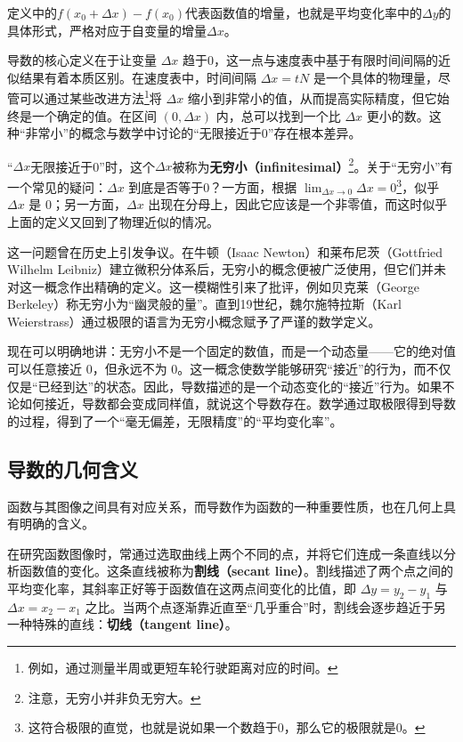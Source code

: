 定义中的$f(x_0+\Delta x)-f(x_0)$代表函数值的增量，也就是平均变化率中的$\Delta y$的具体形式，严格对应于自变量的增量$\Delta x$。

导数的核心定义在于让变量 $\Delta x$ 趋于0，这一点与速度表中基于有限时间间隔的近似结果有着本质区别。在速度表中，时间间隔 $\Delta x = tN$ 是一个具体的物理量，尽管可以通过某些改进方法\footnote{例如，通过测量半周或更短车轮行驶距离对应的时间。}将 $\Delta x$ 缩小到非常小的值，从而提高实际精度，但它始终是一个确定的值。在区间 $(0, \Delta x)$ 内，总可以找到一个比 $\Delta x$ 更小的数。这种“非常小”的概念与数学中讨论的“无限接近于0”存在根本差异。

“$\Delta x$无限接近于0”时，这个$\Delta x$被称为\textbf{无穷小（infinitesimal）}\footnote{注意，无穷小并非负无穷大。}。关于“无穷小”有一个常见的疑问：$\Delta x$ 到底是否等于0？一方面，根据 $\displaystyle\lim_{\Delta x \to 0} \Delta x = 0$\footnote{这符合极限的直觉，也就是说如果一个数趋于0，那么它的极限就是0。}，似乎 $\Delta x$ 是 0；另一方面，$\Delta x$ 出现在分母上，因此它应该是一个非零值，而这时似乎上面的定义又回到了物理近似的情况。

这一问题曾在历史上引发争议。在牛顿（Isaac Newton）和莱布尼茨（Gottfried Wilhelm Leibniz）建立微积分体系后，无穷小的概念便被广泛使用，但它们并未对这一概念作出精确的定义。这一模糊性引来了批评，例如贝克莱（George Berkeley）称无穷小为“幽灵般的量”。直到19世纪，魏尔施特拉斯（Karl Weierstrass）通过极限的语言为无穷小概念赋予了严谨的数学定义。

现在可以明确地讲：无穷小不是一个固定的数值，而是一个动态量——它的绝对值可以任意接近 0，但永远不为 0。这一概念使数学能够研究“接近”的行为，而不仅仅是“已经到达”的状态。因此，导数描述的是一个动态变化的“接近”行为。如果不论如何接近，导数都会变成同样值，就说这个导数存在。数学通过取极限得到导数的过程，得到了一个“毫无偏差，无限精度”的“平均变化率”。

\subsection{导数的几何含义}

函数与其图像之间具有对应关系，而导数作为函数的一种重要性质，也在几何上具有明确的含义。

在研究函数图像时，常通过选取曲线上两个不同的点，并将它们连成一条直线以分析函数值的变化。这条直线被称为\textbf{割线（secant line）}。割线描述了两个点之间的平均变化率，其斜率正好等于函数值在这两点间变化的比值，即 $\Delta y = y_2 - y_1$ 与 $\Delta x = x_2 - x_1$ 之比。当两个点逐渐靠近直至“几乎重合”时，割线会逐步趋近于另一种特殊的直线：\textbf{切线（tangent line）}。

